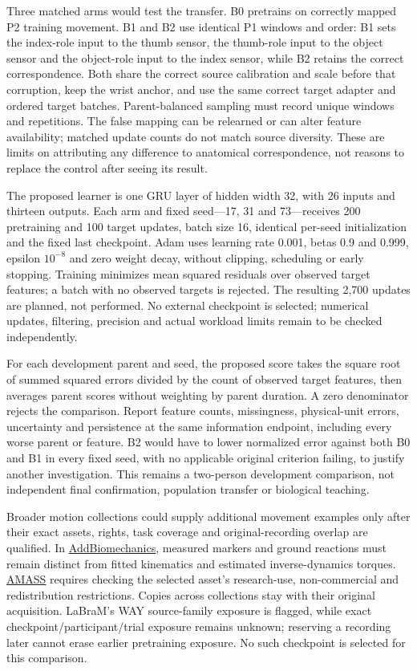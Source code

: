 Three matched arms would test the transfer. B0 pretrains on correctly mapped P2 training movement. B1 and B2 use identical P1 windows and order: B1 sets the index-role input to the thumb sensor, the thumb-role input to the object sensor and the object-role input to the index sensor, while B2 retains the correct correspondence. Both share the correct source calibration and scale before that corruption, keep the wrist anchor, and use the same correct target adapter and ordered target batches. Parent-balanced sampling must record unique windows and repetitions. The false mapping can be relearned or can alter feature availability; matched update counts do not match source diversity. These are limits on attributing any difference to anatomical correspondence, not reasons to replace the control after seeing its result.

The proposed learner is one GRU layer of hidden width 32, with 26 inputs and thirteen outputs. Each arm and fixed seed---17, 31 and 73---receives 200 pretraining and 100 target updates, batch size 16, identical per-seed initialization and the fixed last checkpoint. Adam uses learning rate 0.001, betas 0.9 and 0.999, epsilon $10^{-8}$ and zero weight decay, without clipping, scheduling or early stopping. Training minimizes mean squared residuals over observed target features; a batch with no observed targets is rejected. The resulting 2,700 updates are planned, not performed. No external checkpoint is selected; numerical updates, filtering, precision and actual workload limits remain to be checked independently.

For each development parent and seed, the proposed score takes the square root of summed squared errors divided by the count of observed target features, then averages parent scores without weighting by parent duration. A zero denominator rejects the comparison. Report feature counts, missingness, physical-unit errors, uncertainty and persistence at the same information endpoint, including every worse parent or feature. B2 would have to lower normalized error against both B0 and B1 in every fixed seed, with no applicable original criterion failing, to justify another investigation. This remains a two-person development comparison, not independent final confirmation, population transfer or biological teaching.

Broader motion collections could supply additional movement examples only after their exact assets, rights, task coverage and original-recording overlap are qualified. In \href{https://www.addbiomechanics.org/download_data.html}{AddBiomechanics}, measured markers and ground reactions must remain distinct from fitted kinematics and estimated inverse-dynamics torques. \href{https://amass.is.tue.mpg.de/license.html}{AMASS} requires checking the selected asset's research-use, non-commercial and redistribution restrictions. Copies across collections stay with their original acquisition. LaBraM's WAY source-family exposure is flagged, while exact checkpoint/participant/trial exposure remains unknown; reserving a recording later cannot erase earlier pretraining exposure. No such checkpoint is selected for this comparison.

